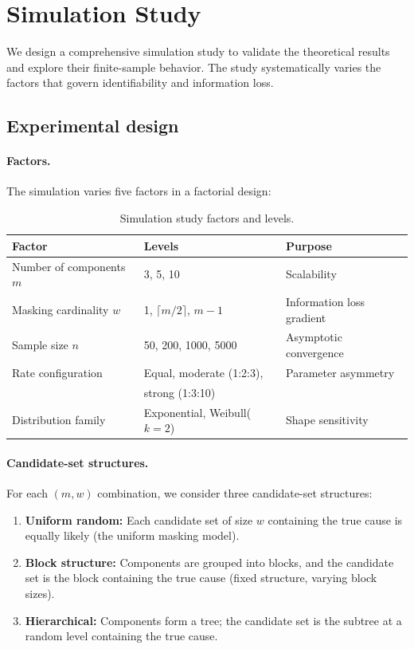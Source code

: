 \documentclass[11pt]{article}
\theoremstyle{definition}
\theoremstyle{plain}
\begin{document}
\section{Simulation Study}
\label{sec:simulation}

We design a comprehensive simulation study to validate the theoretical
results and explore their finite-sample behavior.
The study systematically varies the factors that govern identifiability
and information loss.

\subsection{Experimental design}

\paragraph{Factors.}
The simulation varies five factors in a factorial design:

\begin{table}[ht]
\centering
\caption{Simulation study factors and levels.}
\label{tab:simulation-factors}
\begin{tabular}{@{}lll@{}}
\toprule
\textbf{Factor} & \textbf{Levels} & \textbf{Purpose} \\
\midrule
Number of components $m$ & 3, 5, 10 & Scalability \\
Masking cardinality $w$ & 1, $\lceil m/2 \rceil$, $m-1$
    & Information loss gradient \\
Sample size $n$ & 50, 200, 1000, 5000 & Asymptotic convergence \\
Rate configuration & Equal, moderate (1:2:3),
    & Parameter asymmetry \\
    & strong (1:3:10) & \\
Distribution family & Exponential, Weibull($k{=}2$)
    & Shape sensitivity \\
\bottomrule
\end{tabular}
\end{table}

\paragraph{Candidate-set structures.}
For each $(m, w)$ combination, we consider three candidate-set
structures:
\begin{enumerate}[nosep]
    \item \textbf{Uniform random:} Each candidate set of size $w$
    containing the true cause is equally likely (the uniform masking
    model).
    \item \textbf{Block structure:} Components are grouped into
    blocks, and the candidate set is the block containing the true
    cause (fixed structure, varying block sizes).
    \item \textbf{Hierarchical:} Components form a tree; the
    candidate set is the subtree at a random level containing the
    true cause.
\end{enumerate}
\end{document}
